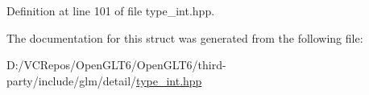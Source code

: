 Definition at line 101 of file type\+\_\+int.\+hpp.



The documentation for this struct was generated from the following file\+:\begin{DoxyCompactItemize}
\item 
D\+:/\+V\+C\+Repos/\+Open\+G\+L\+T6/\+Open\+G\+L\+T6/third-\/party/include/glm/detail/\mbox{\hyperlink{type__int_8hpp}{type\+\_\+int.\+hpp}}\end{DoxyCompactItemize}
